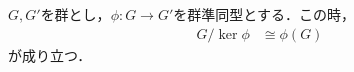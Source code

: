 %




%

\begin{theorem}

$G,G'$を群とし，$\phi:G\to G'$を群準同型とする．この時，
\begin{align}
    G/\ker\phi &\cong \phi(G) 
\end{align}
が成り立つ．
\end{theorem}
